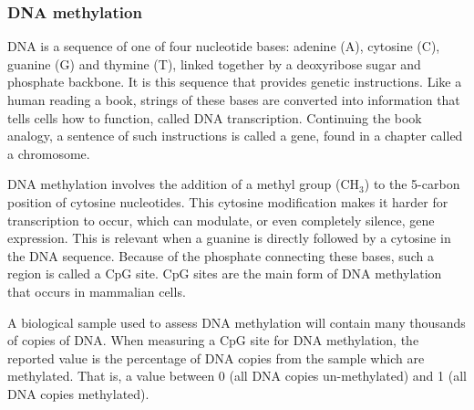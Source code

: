 \documentclass{article}
\begin{document}
\subsubsection{DNA methylation}
DNA is a sequence of one of four nucleotide bases: adenine (A), cytosine (C), guanine (G) and thymine (T), linked together by a deoxyribose sugar and phosphate backbone. It is this sequence that provides genetic instructions. Like a human reading a book, strings of these bases are converted into information that tells cells how to function, called DNA transcription. Continuing the book analogy, a sentence of such instructions is called a gene, found in a chapter called a chromosome.

DNA methylation involves the addition of a methyl group (CH\(_3\)) to the 5-carbon position of cytosine nucleotides. This cytosine modification makes it harder for transcription to occur, which can modulate, or even completely silence, gene expression. This is relevant when a guanine is directly followed by a cytosine in the DNA sequence. Because of the phosphate connecting these bases, such a region is called a CpG site. CpG sites are the main form of DNA methylation that occurs in mammalian cells.

A biological sample used to assess DNA methylation will contain many thousands of copies of DNA. When measuring a CpG site for DNA methylation, the reported value is the percentage of DNA copies from the sample which are methylated. That is, a value between 0 (all DNA copies un-methylated) and 1 (all DNA copies methylated).

\end{document}

